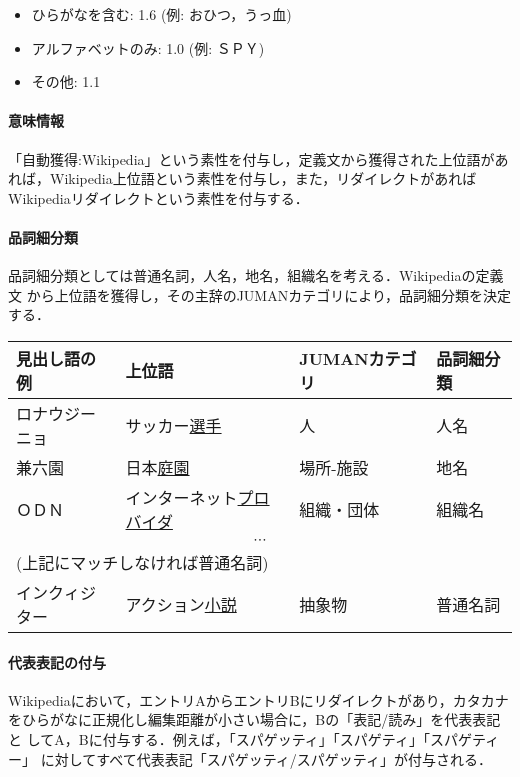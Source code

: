 \documentclass[a4j,titlepage]{jarticle}
\begin{document}
\begin{itemize}
 \item ひらがなを含む: 1.6 (例: おひつ，うっ血)
 \item アルファベットのみ: 1.0 (例: ＳＰＹ)
 \item その他: 1.1
\end{itemize}

\paragraph{意味情報}

「自動獲得:Wikipedia」という素性を付与し，定義文から獲得された上位語があ
れば，Wikipedia上位語という素性を付与し，また，リダイレクトがあれば
Wikipediaリダイレクトという素性を付与する．

\paragraph{品詞細分類}

品詞細分類としては普通名詞，人名，地名，組織名を考える．Wikipediaの定義文
から上位語を獲得し，その主辞のJUMANカテゴリにより，品詞細分類を決定する．

\begin{center}
\begin{tabular}{llll}\hline
見出し語の例 & 上位語 & JUMANカテゴリ & 品詞細分類 \\\hline
ロナウジーニョ & サッカー\underline{選手} & 人 & 人名 \\
兼六園 & 日本\underline{庭園} & 場所-施設 & 地名\\ 
ＯＤＮ & インターネット\underline{プロバイダ} & 組織・団体 & 組織名  \\
\multicolumn{4}{c}{$\cdots$}\\
\multicolumn{4}{l}{(上記にマッチしなければ普通名詞)}\\
インクィジター & アクション\underline{小説} & 抽象物 & 普通名詞  \\
\hline
 \end{tabular}
\end{center}

\paragraph{代表表記の付与}

Wikipediaにおいて，エントリAからエントリBにリダイレクトがあり，カタカナ
をひらがなに正規化し編集距離が小さい場合に，Bの「表記/読み」を代表表記と
してA，Bに付与する．例えば，「スパゲッティ」「スパゲティ」「スパゲティー」
に対してすべて代表表記「スパゲッティ/スパゲッティ」が付与される．
\end{document}
